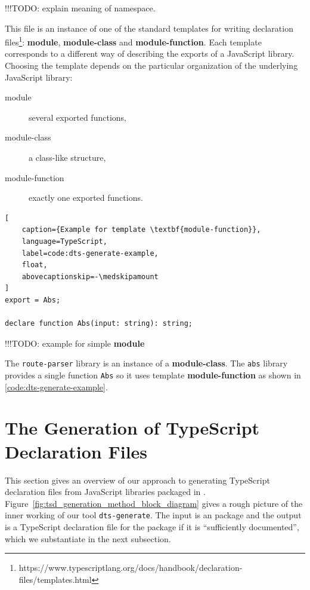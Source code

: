 \documentclass[a4paper,english,cleveref, autoref]{lipics-v2019}
\newcommand{\figref}[1]{Figure~\ref{#1}}
\begin{document}
!!!TODO: explain meaning of namespace.

This file is an instance of one of the standard templates for writing
declaration
files\footnote{https://www.typescriptlang.org/docs/handbook/declaration-files/templates.html}:
\textbf{module}, \textbf{module-class} and
\textbf{module-function}. 
Each template corresponds to a different way of describing the exports
of a JavaScript library. Choosing the template depends on the
particular organization of the underlying JavaScript library:
\begin{description}
\item[module] several exported functions,
\item[module-class] a class-like structure,
\item[module-function] exactly one exported functions.
\end{description}

\begin{lstlisting}[
    caption={Example for template \textbf{module-function}},
    language=TypeScript,
	label=code:dts-generate-example,
    float,
    abovecaptionskip=-\medskipamount
]
export = Abs;

declare function Abs(input: string): string;
\end{lstlisting}
!!!TODO: example for simple \textbf{module}

The \texttt{route-parser} library is an instance of a
\textbf{module-class}. The \texttt{abs} library provides a single
function \lstinline{Abs} so it uses template \textbf{module-function}
as shown in \ref{code:dts-generate-example}. 

\section{The Generation of TypeScript Declaration Files}
\label{sec:gener-typescr-decl}
This section gives an overview of our approach to generating
TypeScript declaration files from JavaScript libraries packaged in
\NPM. \figref{fig:tsd_generation_method_block_diagram} gives a rough
picture of the inner working of our tool \texttt{dts-generate}. The
input is an \NPM{} package and the output is a TypeScript declaration
file for the package if it is ``sufficiently documented'', which we
substantiate in the next subsection.

\end{document}

